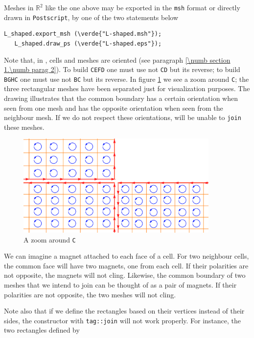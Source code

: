 Meshes in $ \mathbb{R}^2 $ like the one above may be exported in the {\small\tt msh} format
or directly drawn in {\small\tt Postscript}, by one of the two statements below

\begin{Verbatim}[commandchars=\\\{\},formatcom=\small\tt,baselinestretch=0.94]
   L_shaped.export_msh (\verde{"L-shaped.msh"});
   L_shaped.draw_ps (\verde{"L-shaped.eps"});
\end{Verbatim}

Note that, in \maniFEM, cells and meshes are oriented
(see paragraph \ref{\numb section 1.\numb parag 2}).
To build {\small\tt CEFD} one must use not {\small\tt CD} but its reverse;
to build {\small\tt BGHC} one must use not {\small\tt BC} but its reverse.
In figure \ref{\numb section 1.\numb fig 6} we see a zoom around {\small\tt C};
the three rectangular meshes have been separated just for visualization purposes.
The drawing illustrates that the common boundary has a certain orientation when seen
from one mesh and has the opposite orientation when seen from the neighbour mesh.
If we do not respect these orientations, {\maniFEM} will be unable to {\small\tt join}
these meshes.

\begin{figure}[ht]  \centering
  \includegraphics[width=100mm]{L-crack}
  \caption{A zoom around {\small\tt C}}
  \label{\numb section 1.\numb fig 6}
\end{figure}

We can imagine a magnet attached to each face of a cell.
For two neighbour cells, the common face will have two magnets, one from each cell.
If their polarities are not opposite, the magnets will not cling.
Likewise, the common boundary of two meshes that we intend to join can be thought of
as a pair of magnets.
If their polarities are not opposite, the two meshes will not cling.

Note also that if we define the rectangles based on their vertices instead of their sides, 
the {\small\tt {}} constructor with {\small\tt \textcolor{tag}{tag}::join} will not work properly. 
For instance, the two rectangles defined by

